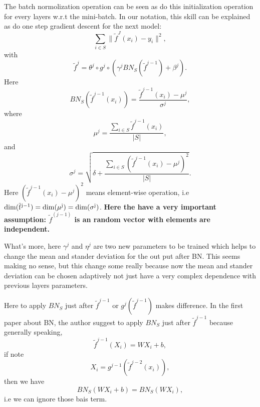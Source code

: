 The batch normolization operation can be seen as do this initialization operation for every layers w.r.t the mini-batch. In our notation, this skill can be explained as do one step gradient descent for the next model:
\begin{equation}
\sum_{i \in S} \|\tilde {f}^J(x_i) - y_i\|^2,
\end{equation}
with
\begin{equation}
\tilde f^j = \theta^j \circ g^j \circ (\gamma^j BN_{S} (\tilde f^{j-1}) + \beta^j).
\end{equation}
Here
\begin{equation}
BN_{S}( \tilde f^{j-1}(x_i) )= \frac{\tilde f^{j-1}(x_i) - \mu^j}{\sigma^j},
\end{equation}
where
\begin{equation}
\mu^j = \frac{\sum_{i\in S}  \tilde f^{j-1}(x_i) }{|S|},
\end{equation}
and
\begin{equation}
\sigma^j  = \sqrt{ \delta + \frac{ \sum_{i\in S} (  \tilde f^{j-1}(x_i) - \mu^j)^2}{|S|} }.
\end{equation}
Here $(  \tilde f^{j-1}(x_i) - \mu^j)^2$ means element-wise operation, i.e $\rm{dim}(\tilde f^{j-1}) = \rm{dim}(\mu^j) = \rm{dim}(\sigma^j)$.
{\bf{Here the have a very important assumption: $\tilde f^{(j-1)}$ is an random vector with elements are independent.} }

What's more, here $\gamma^j$ and $\eta^j$ are two new parameters to be trained which helps to change the mean and stander deviation for the out put after BN. This seems making no sense, but this change some really because now the mean and stander deviation can be chosen adaptively not just have a very complex dependence with previous layers parameters.

\begin{remark}
Here to apply $BN_S$ just after $\tilde f^{j-1}$ or $g^j(\tilde f^{j-1})$ makes difference. In the first paper about BN, the author suggest to apply $BN_S$ just after $\tilde f^{j-1}$ because generally speaking,
\begin{equation}
\tilde f^{j-1}(X_i) = WX_i + b,
\end{equation}
if note
\begin{equation}
X_i = g^{j-1}(\tilde f^{j-2}(x_i)),
\end{equation}
then we have
\begin{equation}
BN_{S}(WX_i + b) = BN_S(WX_i),
\end{equation}
i.e we can ignore those bais term.

\end{remark}


